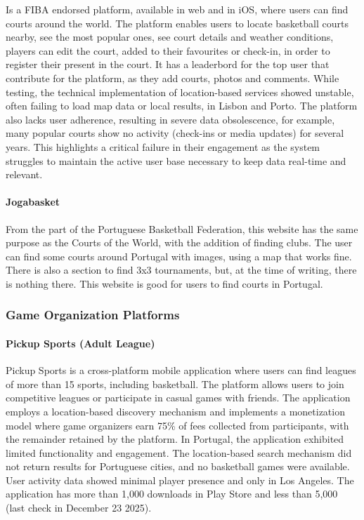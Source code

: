 Is a FIBA endorsed platform, available in web and in iOS, where users can find courts around the world. The platform enables users to locate basketball courts nearby, see the most popular ones, see court details and weather conditions, players can edit the court, added to their favourites or check-in, in order to register their present in the court. It has a leaderbord for the top user that contribute for the platform, as they add courts, photos and comments. While testing, the technical implementation of location-based services showed unstable, often failing to load map data or local results, in Lisbon and Porto. The platform also lacks user adherence, resulting in severe data obsolescence, for example, many popular courts show no activity (check-ins or media updates) for several years. This highlights a critical failure in their engagement as the system struggles to maintain the active user base necessary to keep data real-time and relevant.

\paragraph{\textbf{Jogabasket}}

From the part of the Portuguese Basketball Federation, this website has the same purpose as the Courts of the World, with the addition of finding clubs. The user can find some courts around Portugal with images, using a map that works fine. There is also a section to find 3x3 tournaments, but, at the time of writing, there is nothing there. This website is good for users to find courts in Portugal.

\subsubsection{Game Organization Platforms}


\paragraph{\textbf{Pickup Sports (Adult League)}} 

Pickup Sports is a cross-platform mobile application where users can find leagues of more than 15 sports, including basketball. The platform allows users to join competitive leagues or participate in casual games with friends. The application employs a location-based discovery mechanism and implements a monetization model where game organizers earn 75\% of fees collected from participants, with the remainder retained by the platform. In Portugal, the application exhibited limited functionality and engagement. The location-based search mechanism did not return results for Portuguese cities, and no basketball games were available. User activity data showed minimal player presence and only in Los Angeles. The application has more than 1,000 downloads in Play Store and less than 5,000 (last check in December 23 2025).


